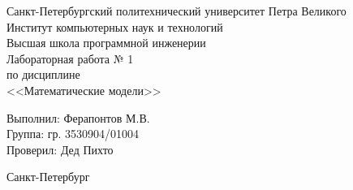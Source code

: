 \begin{titlepage}	%

	\begin{center}		%

		\large Санкт-Петербургский политехнический университет Петра Великого\\
		\large Институт компьютерных наук и технологий\\
		\large Высшая школа программной инженерии \\[6cm]

    \huge Лабораторная работа № 1\\[0.5cm] %
		\large по дисциплине\\[0.1cm]
		\large <<Математические модели>>

	\end{center}

		\noindent\large Выполнил: \hfill \large Ферапонтов М.В.\\
		\noindent\large Группа: \hfill \large гр. 3530904/01004\\

		\noindent\large Проверил: \hfill \large Дед Пихто

	\vfill %

	\begin{center}
	\large Санкт-Петербург\\
	\large \the\year %
	\end{center} %

\end{titlepage} %

\vfill %

